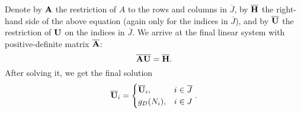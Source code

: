 \begin{discussion}
  Denote by ${\bf A}$ the restriction of $A$ to the rows and columns in
  $\overline{J}$, by $\overline{\bf H}$ the right-hand side of the above
  equation (again only for the indices in $\overline{J}$),
  and by $\overline{\bf U}$ the restriction of ${\bf U}$ on the indices
  in $\overline{J}$.
  We arrive at the final linear system with positive-definite matrix
  $\overline{\bf A}$:
  \begin{equation}
    \overline{\bf A} \overline{\bf U} = \overline{\bf H}.
  \end{equation}
  After solving it, we get the final solution
  \begin{equation}
    \overline{\bf U}_i =
    \begin{cases}
      \overline{\bf U}_i, & i \in \overline{J} \\
      g_D(N_i), & i \in J
    \end{cases}.
  \end{equation}
\end{discussion}
